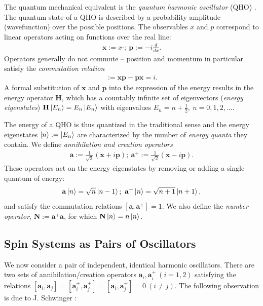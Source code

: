 \documentclass[12pt,final,3p]{elsarticle}
\begin{document}
The quantum mechanical equivalent is the \emph{quantum harmonic oscillator} (QHO) \cite{townsend2000modern}. The quantum state of a QHO is described by a probability amplitude (wavefunction) over the possible positions. The observables $x$ and $p$ correspond to linear operators acting on functions over the real line:
\begin{align}
\mathbf{x} := x \cdot;\ \mathbf{p} := -i\frac{d}{dx}.
\end{align}
Operators generally do not commute -- position and momentum in particular satisfy the \emph{commutation relation}
\begin{align}
[\mathbf{x}, \mathbf{p}] := \mathbf{x}\mathbf{p} - \mathbf{p}\mathbf{x} = i.
\end{align}
A formal substitution of $\mathbf{x}$ and $\mathbf{p}$ into the expression of the energy results in the energy operator $\mathbf{H}$, which has a countably infinite set of eigenvectors (\emph{energy eigenstates}) $\mathbf{H}\ket{E_{n}} = E_{n}\ket{E_{n}}$ with eigenvalues $E_{n} =  n + \frac{1}{2},\ n = 0, 1, 2, \ldots.$

The energy of a QHO is thus quantized in the traditional sense and the energy eigenstates $\ket{n} := \ket{E_{n}}$ are characterized by the number of \emph{energy quanta} they contain. We define \emph{annihilation and creation operators}
\begin{align}\label{eq:creat_def}
\mathbf{a} := \frac{1}{\sqrt{2}}\left( \mathbf{x} + i \mathbf{p} \right);\ \mathbf{a}^{+} :=  \frac{1}{\sqrt{2}}\left( \mathbf{x} - i \mathbf{p} \right).
\end{align} 
These operators act on the energy eigenstates by removing or adding a single quantum of energy: 
\begin{align}\label{eq:creat_effect}
\mathbf{a}\ket{n} = \sqrt{n}\ket{n-1};\ \mathbf{a}^{+}\ket{n} = \sqrt{n+1}\ket{n+1}, 
\end{align}
and satisfy the commutation relations $[\mathbf{a},\mathbf{a}^{+}] = 1$.
We also define the \emph{number operator}, $\mathbf{N} := \mathbf{a}^{+}\mathbf{a}$, for which $\mathbf{N}\ket{n} = n\ket{n}$.
\subsection{Spin Systems as Pairs of Oscillators}
We now consider a pair of independent, identical harmonic oscillators. There are two sets of annihilation/creation operators $ \mathbf{a}_{i}, \mathbf{a}^{+}_{i}\  (i = 1,2)$ satisfying the relations $[\mathbf{a}_{i},\mathbf{a}_{j}] = [\mathbf{a}^{+}_{i}, \mathbf{a}^{+}_{j}] = [\mathbf{a}_{i}, \mathbf{a}^{+}_{j}] = 0\  (i \neq j).$
The following observation is due to J. Schwinger \cite{schwinger1952angular}:
\end{document}

